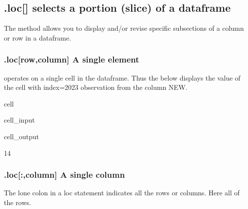 \documentclass[letterpaper,10pt,english]{jupyterBook}
\begin{document}
\subsection{.loc{[}{]} selects a portion (slice) of a dataframe}
\label{\detokenize{content/04_PythonEssentials/PythonPandasDataframes:loc-selects-a-portion-slice-of-a-dataframe}}
\sphinxAtStartPar
The  method allows you to display and/or revise specific sub\sphinxhyphen{}sections of a column or row in a dataframe.


\subsubsection{.loc{[}row,column{]} A single element}
\label{\detokenize{content/04_PythonEssentials/PythonPandasDataframes:loc-row-column-a-single-element}}
\sphinxAtStartPar
{} operates on a single cell in the dataframe.  Thus the below displays the value of the cell with index=2023 observation from the column NEW.

\begin{sphinxuseclass}{cell}\begin{sphinxVerbatimInput}

\begin{sphinxuseclass}{cell_input}
\begin{sphinxVerbatim}[commandchars=\\\{\}]
\PYG{p}{[}\PYG{p}{]}
\end{sphinxVerbatim}

\end{sphinxuseclass}\end{sphinxVerbatimInput}
\begin{sphinxVerbatimOutput}

\begin{sphinxuseclass}{cell_output}
\begin{sphinxVerbatim}[commandchars=\\\{\}]
14
\end{sphinxVerbatim}

\end{sphinxuseclass}\end{sphinxVerbatimOutput}

\end{sphinxuseclass}

\subsubsection{.loc{[}:,column{]} A single column}
\label{\detokenize{content/04_PythonEssentials/PythonPandasDataframes:loc-column-a-single-column}}
\sphinxAtStartPar
The lone colon in a loc statement indicates all the rows or columns.  Here all of the rows.
\end{document}
